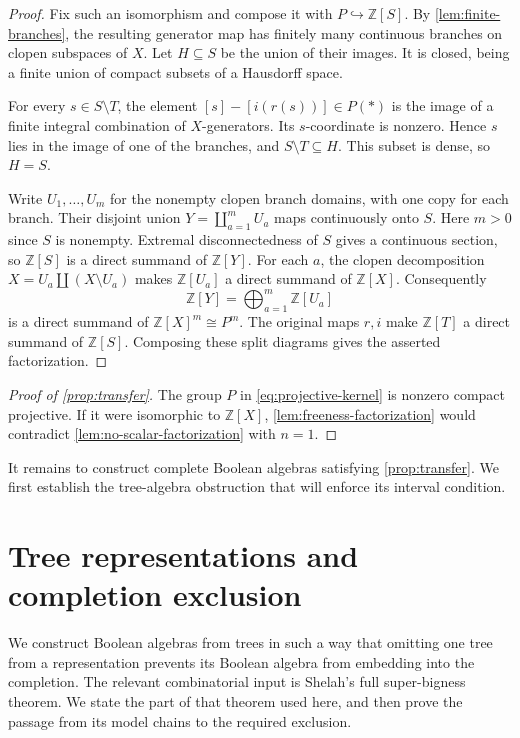 \documentclass[11pt]{article}
\theoremstyle{definition}
\theoremstyle{remark}
\newcommand{\Z}{\mathbb Z}
\begin{document}
\begin{proof}
Fix such an isomorphism and compose it with $P\hookrightarrow\Z[S]$.
By \cref{lem:finite-branches}, the resulting generator map has
finitely many continuous branches on clopen subspaces of $X$.
Let $H\subseteq S$ be the union of their images. It is closed,
being a finite union of compact subsets of a Hausdorff space.

For every $s\in S\setminus T$, the element
$[s]-[i(r(s))]\in P(*)$ is the image of a finite integral combination
of $X$-generators. Its $s$-coordinate is nonzero. Hence $s$ lies in
the image of one of the branches, and $S\setminus T\subseteq H$.
This subset is dense, so $H=S$.

Write $U_1,\ldots,U_m$ for the nonempty clopen branch domains, with
one copy for each branch. Their disjoint union
$Y=\coprod_{a=1}^m U_a$ maps continuously onto $S$. Here $m>0$ since
$S$ is nonempty. Extremal disconnectedness of $S$ gives a continuous
section, so $\Z[S]$ is a direct summand of $\Z[Y]$.
For each $a$, the clopen decomposition
$X=U_a\amalg(X\setminus U_a)$ makes $\Z[U_a]$ a direct summand of
$\Z[X]$. Consequently
\[
 \Z[Y]=\bigoplus_{a=1}^m\Z[U_a]
\]
is a direct summand of $\Z[X]^m\cong P^m$.
The original maps $r,i$ make $\Z[T]$ a direct summand of $\Z[S]$.
Composing these split diagrams gives the asserted factorization.
\end{proof}

\begin{proof}[Proof of \cref{prop:transfer}]
The group $P$ in \eqref{eq:projective-kernel} is nonzero compact
projective. If it were isomorphic to $\Z[X]$,
\cref{lem:freeness-factorization} would contradict
\cref{lem:no-scalar-factorization} with $n=1$.
\end{proof}

It remains to construct complete Boolean algebras satisfying
\cref{prop:transfer}. We first establish the tree-algebra obstruction
that will enforce its interval condition.

\section{Tree representations and completion exclusion}\label{sec:trees}

We construct Boolean algebras from trees in such a way that omitting one tree
from a representation prevents its Boolean algebra from embedding into the
completion.  The relevant combinatorial input is Shelah's full super-bigness
theorem.  We state the part of that theorem used here, and then prove the
passage from its model chains to the required exclusion.
\end{document}
